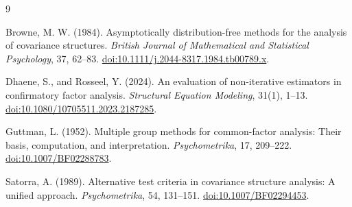 \documentclass[11pt]{article}
\theoremstyle{plain}
\theoremstyle{remark}
\begin{document}
\begin{thebibliography}{9}

Browne, M. W. (1984).
Asymptotically distribution-free methods for the analysis of covariance
structures.
\emph{British Journal of Mathematical and Statistical Psychology}, 37, 62--83.
\href{https://doi.org/10.1111/j.2044-8317.1984.tb00789.x}{doi:10.1111/j.2044-8317.1984.tb00789.x}.

Dhaene, S., and Rosseel, Y. (2024).
An evaluation of non-iterative estimators in confirmatory factor analysis.
\emph{Structural Equation Modeling}, 31(1), 1--13.
\href{https://doi.org/10.1080/10705511.2023.2187285}{doi:10.1080/10705511.2023.2187285}.

Guttman, L. (1952).
Multiple group methods for common-factor analysis: Their basis, computation, and
interpretation.
\emph{Psychometrika}, 17, 209--222.
\href{https://doi.org/10.1007/BF02288783}{doi:10.1007/BF02288783}.

Satorra, A. (1989).
Alternative test criteria in covariance structure analysis: A unified approach.
\emph{Psychometrika}, 54, 131--151.
\href{https://doi.org/10.1007/BF02294453}{doi:10.1007/BF02294453}.

\end{thebibliography}
\end{document}
